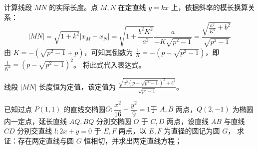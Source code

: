 \begin{solution}
计算线段 $MN$ 的实际长度。点 $M, N$ 在定直线 $y = kx$ 上，依据斜率的模长换算关系：
\[ |MN| = \sqrt{1 + k^2} |x_M - x_N| = \sqrt{1 + \frac{b^2 K^2}{a^2}} \frac{a}{-K\sqrt{p^2 - 1}} = \frac{\sqrt{\frac{a^2}{K^2} + b^2}}{\sqrt{p^2 - 1}} \]
由 $K = -(\sqrt{p^2 - 1} + p)$，可知其倒数为 $\frac{1}{K} = -(p - \sqrt{p^2 - 1})$，即 $\frac{1}{K^2} = (p - \sqrt{p^2 - 1})^2$。
将此式代入表达式。

线段 $|MN|$ 长度恒为定值，该定值为 $\frac{\sqrt{a^2\left(p - \sqrt{p^2 - 1}\right)^2 + b^2}}{\sqrt{p^2 - 1}}$。
\end{solution}



\begin{exercise}
已知过点 $P(1,1)$ 的直线交椭圆$O: \dfrac{x^2}{16} + \dfrac{y^2}{9} = 1$于 $A,B$ 两点，$Q(2,-1)$ 为椭圆内一定点，延长直线 $AQ,BQ$ 分别交椭圆 $O$ 于 $C,D$ 两点，设直线 $AB$ 与直线 $CD$ 分别交直线 $l: 2x + y = 0$ 于 $E,F$ 两点，以 $E,F$ 为直径的圆记为圆 $G$，
求证：存在两定直线与圆 $G$ 恒相切，并求出两定直线方程；
\end{exercise}

